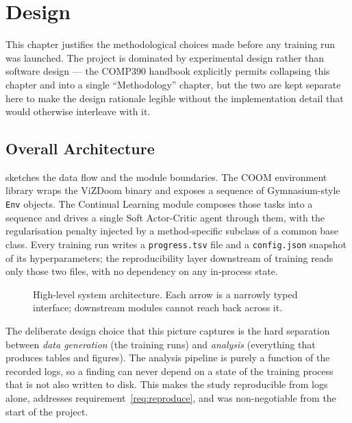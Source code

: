 \chapter{Design}
\label{ch:design}

This chapter justifies the methodological choices made before any
training run was launched. The project is dominated by experimental
design rather than software design --- the COMP390 handbook
explicitly permits collapsing this chapter and  into a
single ``Methodology'' chapter, but the two are kept separate here
to make the design rationale legible without the implementation
detail that would otherwise interleave with it.

\section{Overall Architecture}
\label{sec:arch}

 sketches the data flow and the module boundaries.
The COOM environment library wraps the ViZDoom binary and exposes a
sequence of Gymnasium-style \texttt{Env} objects. The Continual
Learning module composes those tasks into a sequence and drives a
single Soft Actor-Critic agent through them, with the regularisation
penalty injected by a method-specific subclass of a common base
class. Every training run writes a \texttt{progress.tsv} file and a
\texttt{config.json} snapshot of its hyperparameters; the
reproducibility layer downstream of training reads only those two
files, with no dependency on any in-process state.

\begin{figure}[t]
    \centering
    \caption{High-level system architecture. Each arrow is a
        narrowly typed interface; downstream modules cannot reach
        back across it.}
    \label{fig:arch}
\end{figure}

The deliberate design choice that this picture captures is the
hard separation between \emph{data generation} (the training
runs) and \emph{analysis} (everything that produces tables and
figures). The analysis pipeline is purely a function of the
recorded logs, so a finding can never depend on a state of the
training process that is not also written to disk. This makes the
study reproducible from logs alone, addresses
requirement~\ref{req:reproduce}, and was non-negotiable from the
start of the project.

